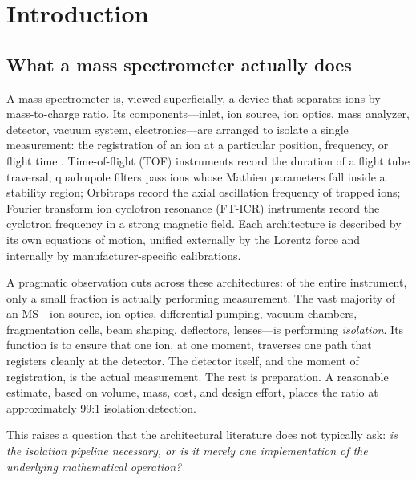 \documentclass[twocolumn,11pt,a4paper]{article}
\theoremstyle{definition}
\theoremstyle{remark}
\begin{document}
\section{Introduction}
\label{sec:introduction}

\subsection{What a mass spectrometer actually does}

A mass spectrometer is, viewed superficially, a device that separates ions by mass-to-charge ratio. Its components---inlet, ion source, ion optics, mass analyzer, detector, vacuum system, electronics---are arranged to isolate a single measurement: the registration of an ion at a particular position, frequency, or flight time \citep{gross2017,hoffmann2007}. Time-of-flight (TOF) instruments \citep{wiley1955,cotter1992} record the duration of a flight tube traversal; quadrupole filters \citep{paul1990,march2005} pass ions whose Mathieu parameters fall inside a stability region; Orbitraps \citep{makarov2000,hu2005} record the axial oscillation frequency of trapped ions; Fourier transform ion cyclotron resonance (FT-ICR) instruments \citep{comisarow1974,marshall1998} record the cyclotron frequency in a strong magnetic field. Each architecture is described by its own equations of motion, unified externally by the Lorentz force and internally by manufacturer-specific calibrations.

A pragmatic observation cuts across these architectures: of the entire instrument, only a small fraction is actually performing measurement. The vast majority of an MS---ion source, ion optics, differential pumping, vacuum chambers, fragmentation cells, beam shaping, deflectors, lenses---is performing \emph{isolation}. Its function is to ensure that one ion, at one moment, traverses one path that registers cleanly at the detector. The detector itself, and the moment of registration, is the actual measurement. The rest is preparation. A reasonable estimate, based on volume, mass, cost, and design effort, places the ratio at approximately 99:1 isolation:detection.

This raises a question that the architectural literature does not typically ask: \emph{is the isolation pipeline necessary, or is it merely one implementation of the underlying mathematical operation?}
\end{document}
